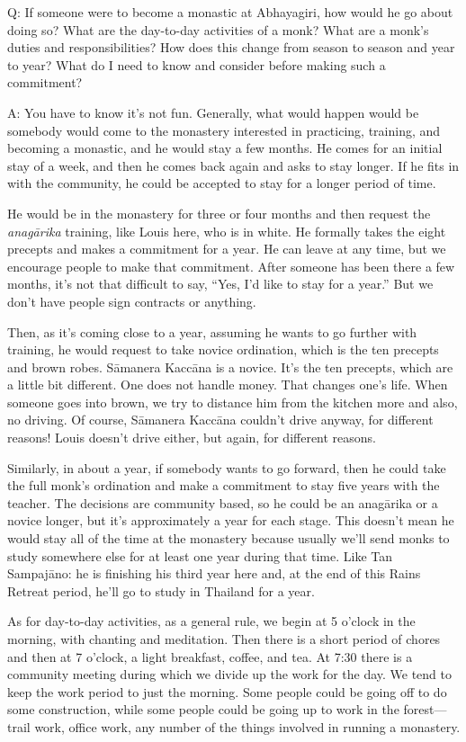 \qaspace
Q: If someone were to become a monastic at Abhayagiri, how would he go
about doing so? What are the day-to-day activities of a monk? What are a
monk’s duties and responsibilities? How does this change from season to
season and year to year? What do I need to know and consider before
making such a commitment?

\qaspace
A: You have to know it’s not fun. Generally, what would happen would be
somebody would come to the monastery interested in practicing, training,
and becoming a monastic, and he would stay a few months. He comes for an
initial stay of a week, and then he comes back again and asks to stay
longer. If he fits in with the community, he could be accepted to stay
for a longer period of time.

He would be in the monastery for three or four months and then request
the \emph{anagārika} training, like Louis here, who is in white. He
formally takes the eight precepts and makes a commitment for a year. He
can leave at any time, but we encourage people to make that commitment.
After someone has been there a few months, it’s not that difficult to
say, “Yes, I’d like to stay for a year.” But we don’t have people sign
contracts or anything.

Then, as it’s coming close to a year, assuming he wants to go further
with training, he would request to take novice ordination, which is the
ten precepts and brown robes. Sāmanera Kaccāna is a novice. It’s the ten
precepts, which are a little bit different. One does not handle money.
That changes one’s life. When someone goes into brown, we try to
distance him from the kitchen more and also, no driving. Of course,
Sāmanera Kaccāna couldn’t drive anyway, for different reasons! Louis
doesn’t drive either, but again, for different reasons.

Similarly, in about a year, if somebody wants to go forward, then he
could take the full monk’s ordination and make a commitment to stay five
years with the teacher. The decisions are community based, so he could
be an anagārika or a novice longer, but it’s approximately a year for
each stage. This doesn’t mean he would stay all of the time at the
monastery because usually we’ll send monks to study somewhere else for
at least one year during that time. Like Tan Sampajāno: he is finishing
his third year here and, at the end of this Rains Retreat period, he’ll
go to study in Thailand for a year.

As for day-to-day activities, as a general rule, we begin at 5 o’clock
in the morning, with chanting and meditation. Then there is a short
period of chores and then at 7 o’clock, a light breakfast, coffee, and
tea. At 7:30 there is a community meeting during which we divide up the
work for the day. We tend to keep the work period to just the morning.
Some people could be going off to do some construction, while some
people could be going up to work in the forest—trail work, office work,
any number of the things involved in running a monastery.

